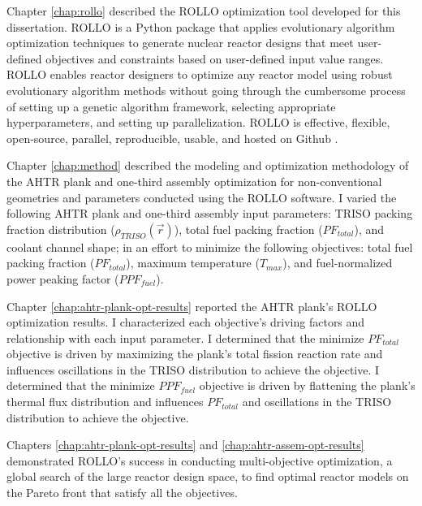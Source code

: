 Chapter \ref{chap:rollo} described the \gls{ROLLO} optimization tool developed for this 
dissertation. 
\gls{ROLLO} is a Python package that applies evolutionary algorithm 
optimization techniques to generate nuclear reactor designs that meet user-defined 
objectives and constraints based on user-defined input value ranges. 
\gls{ROLLO} enables reactor designers to optimize any reactor model using robust 
evolutionary algorithm methods without going through the cumbersome process of setting up 
a genetic algorithm framework, selecting appropriate hyperparameters, and setting up
parallelization.
\gls{ROLLO} is effective, flexible, open-source, parallel, reproducible, usable, and 
hosted on Github \cite{chee_rollo_2021}. 

Chapter \ref{chap:method} described the modeling and optimization methodology of the 
\gls{AHTR} plank and one-third assembly optimization for non-conventional 
geometries and parameters conducted using the \gls{ROLLO} software.
I varied the following \gls{AHTR} plank and one-third assembly input parameters: 
\gls{TRISO} packing fraction distribution ($\rho_{TRISO}(\vec{r})$), total fuel 
packing fraction ($PF_{total}$), and coolant channel shape; in an effort to minimize 
the following objectives: total fuel packing fraction ($PF_{total}$), maximum 
temperature ($T_{max}$), and fuel-normalized power peaking factor ($PPF_{fuel}$). 

Chapter \ref{chap:ahtr-plank-opt-results} reported the \gls{AHTR} plank's 
\gls{ROLLO} optimization results.
I characterized each objective's driving factors and relationship with each input 
parameter. 
I determined that the minimize $PF_{total}$ objective is driven by maximizing the plank's 
total fission reaction rate and influences oscillations in the TRISO distribution to 
achieve the objective. 
I determined that the minimize $PPF_{fuel}$ objective is driven by flattening the plank's
thermal flux distribution and influences $PF_{total}$ and oscillations in the TRISO 
distribution to achieve the objective.

Chapters \ref{chap:ahtr-plank-opt-results} and  \ref{chap:ahtr-assem-opt-results} 
demonstrated \gls{ROLLO}'s success in conducting multi-objective optimization, a global 
search of the large reactor design space, to find optimal reactor models on the Pareto 
front that satisfy all the objectives. 


